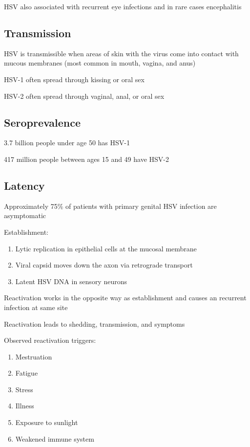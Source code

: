 \documentclass{notes}
\begin{document}
HSV also associated with recurrent eye infections and in rare cases encephalitis

\subsection{Transmission}

HSV is transmissible when areas of skin with the virus come into contact with mucous membranes (most common in mouth, vagina, and anus)

HSV-1 often spread through kissing or oral sex

HSV-2 often spread through vaginal, anal, or oral sex

\subsection{Seroprevalence}

3.7 billion people under age 50 has HSV-1

417 million people between ages 15 and 49 have HSV-2

\subsection{Latency}

Approximately 75\% of patients with primary genital HSV infection are asymptomatic

Establishment:

\begin{enumerate}
    \item Lytic replication in epithelial cells at the mucosal membrane
    \item Viral capsid moves down the axon via retrograde transport
    \item Latent HSV DNA in sensory neurons
\end{enumerate}

Reactivation works in the opposite way as establishment and causes an recurrent infection at same site

\tab Reactivation leads to shedding, transmission, and symptoms

Observed reactivation triggers:

\begin{enumerate}
    \item Mestruation
    \item Fatigue
    \item Stress
    \item Illness
    \item Exposure to sunlight
    \item Weakened immune system
\end{enumerate}
\end{document}
